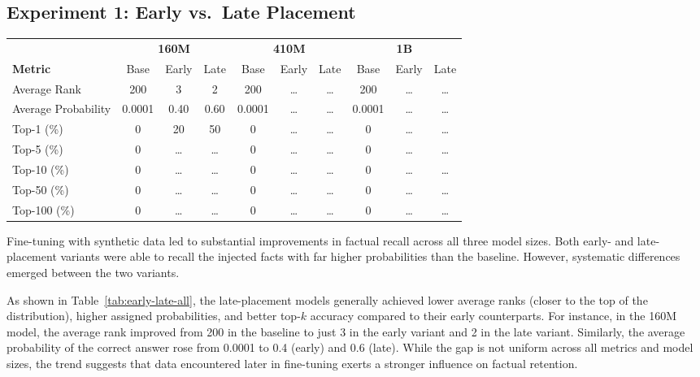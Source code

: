 \documentclass[11pt]{article}
\begin{document}
\subsection{Experiment 1: Early vs.\ Late Placement}
\begin{table*}[htbp]
\centering
\small
\begin{tabular}{l|ccc|ccc|ccc}
\hline
 & \multicolumn{3}{c|}{\textbf{160M}} & \multicolumn{3}{c|}{\textbf{410M}} & \multicolumn{3}{c}{\textbf{1B}} \\
\textbf{Metric} & Base & Early & Late & Base & Early & Late & Base & Early & Late \\
\hline
Average Rank        & 200    & 3      & 2      & 200    & \dots & \dots & 200    & \dots & \dots \\
Average Probability & 0.0001 & 0.40   & 0.60   & 0.0001 & \dots & \dots & 0.0001 & \dots & \dots \\
Top-1 (\%)          & 0      & 20     & 50     & 0      & \dots & \dots & 0      & \dots & \dots \\
Top-5 (\%)          & 0      & \dots  & \dots  & 0      & \dots & \dots & 0      & \dots & \dots \\
Top-10 (\%)         & 0      & \dots  & \dots  & 0      & \dots & \dots & 0      & \dots & \dots \\
Top-50 (\%)         & 0      & \dots  & \dots  & 0      & \dots & \dots & 0      & \dots & \dots \\
Top-100 (\%)        & 0      & \dots  & \dots  & 0      & \dots & \dots & 0      & \dots & \dots \\
\hline
\end{tabular}
\caption{Experiment 1: Early vs.\ late placement across all three model sizes. 
Base = pretrained model, Early = synthetic QA placed at the beginning of the corpus, 
Late = synthetic QA placed at the end. Replace \dots\ with actual measured values.}
\label{tab:early-late-all}
\end{table*}


Fine-tuning with synthetic data led to substantial improvements in factual recall across all three model sizes. Both early- and late-placement variants were able to recall the injected facts with far higher probabilities than the baseline. However, systematic differences emerged between the two variants.

As shown in Table~\ref{tab:early-late-all}, the late-placement models generally achieved lower average ranks (closer to the top of the distribution), higher assigned probabilities, and better top-$k$ accuracy compared to their early counterparts. For instance, in the 160M model, the average rank improved from 200 in the baseline to just 3 in the early variant and 2 in the late variant. Similarly, the average probability of the correct answer rose from 0.0001 to 0.4 (early) and 0.6 (late). While the gap is not uniform across all metrics and model sizes, the trend suggests that data encountered later in fine-tuning exerts a stronger influence on factual retention.
\end{document}
